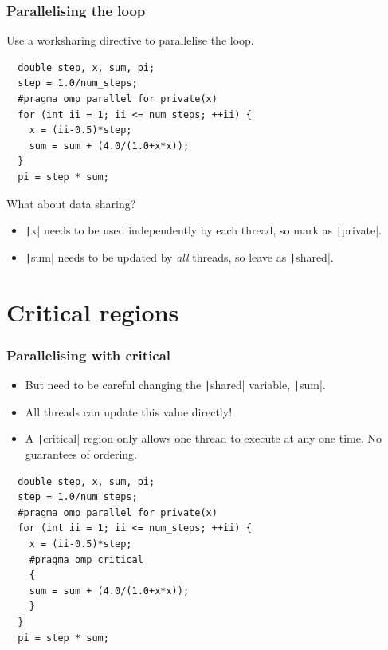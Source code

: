 \documentclass[aspectratio=169]{beamer}
\begin{document}
\begin{frame}[fragile]
\frametitle{Parallelising the loop}

Use a worksharing directive to parallelise the loop.

\begin{verbatim}
  double step, x, sum, pi;
  step = 1.0/num_steps;
  #pragma omp parallel for private(x)
  for (int ii = 1; ii <= num_steps; ++ii) {
    x = (ii-0.5)*step;
    sum = sum + (4.0/(1.0+x*x));
  }
  pi = step * sum;
\end{verbatim}

\vfill

What about data sharing?
\begin{itemize}
  \item \texttt|x| needs to be used independently by each thread, so mark as \texttt|private|.
  \item \texttt|sum| needs to be updated by \emph{all} threads, so leave as \texttt|shared|.
\end{itemize}

\end{frame}

\section{Critical regions}
\begin{frame}[fragile]
\frametitle{Parallelising with critical}
\begin{itemize}
  \item But need to be careful changing the \texttt|shared| variable, \texttt|sum|.
  \item All threads can update this value directly!
  \item A \texttt|critical| region only allows one thread to execute at any one time. No guarantees of ordering.
\end{itemize}

\begin{verbatim}
  double step, x, sum, pi;
  step = 1.0/num_steps;
  #pragma omp parallel for private(x)
  for (int ii = 1; ii <= num_steps; ++ii) {
    x = (ii-0.5)*step;
    #pragma omp critical
    {
    sum = sum + (4.0/(1.0+x*x));
    }
  }
  pi = step * sum;
\end{verbatim}

\end{frame}
\end{document}
